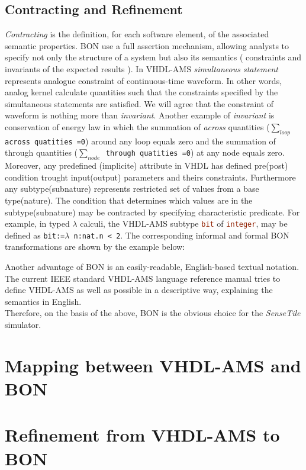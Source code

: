 \documentclass{article}
\def\lstinlinenc{\lstinline[language=VHDL,basicstyle=\normalsize\bfseries]}
\newcommand{\ST}{\emph{SenseTile}\xspace}
\newcommand{\arcoss}{\emph{across}\xspace}
\begin{document}
\subsection{Contracting and Refinement}
\emph{Contracting} is the definition, for each software element, 
of the associated semantic properties. BON use a full assertion mechanism, 
allowing analysts to specify not only the structure of a system but also its
semantics ( constraints and invariants of the expected results ). 
In VHDL-AMS \emph{simultaneous statement} represents analogue constraint of 
continuous-time waveform. In other words, analog kernel calculate quantities such 
that the constraints specified by the simultaneous statements are satisfied. 
We will agree that the constraint of waveform is nothing more than \emph{invariant}.
Another example of \emph{invariant} is conservation of energy law in which 
the summation of \arcoss quantities (\texttt{$\sum_{loop}$ across quatities =0}) 
around any loop equals zero and the summation of through 
quantities (\texttt{$\sum_{node}$ through quatities =0}) at any node equals zero. 
Moreover, any predefined (implicite) attribute in VHDL 
has defined pre(post) condition trought input(output) 
parameters and theirs constraints. Furthermore any subtype(subnature) 
represents restricted set of values from a base type(nature). 
The condition that determines which values are in the subtype(subnature)  
may be contracted by specifying characteristic predicate. 
For example, in typed $\lambda$ calculi, the VHDL-AMS subtype \lstinlinenc|bit| of 
\lstinlinenc|integer|, may be defined as \texttt{bit:=$\lambda$ n:nat.n < 2}. 
The corresponding informal and formal BON transformations are shown 
by the example below:

Another advantage of BON is an easily-readable, English-based textual notation. 
The current IEEE standard VHDL-AMS language reference manual tries to define 
VHDL-AMS as well as possible in a descriptive way, explaining the 
semantics in English.\\
Therefore, on the basis of the above, BON is the obvious choice 
for the \ST simulator.
\section{Mapping between VHDL-AMS and BON}


\section{Refinement from VHDL-AMS to BON }
 
\end{document}
